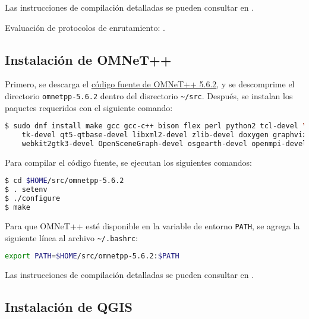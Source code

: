 Las instrucciones de compilación detalladas se pueden consultar en
\cite{CompilacionSUMO}.

Evaluación de protocolos de enrutamiento: \cite{Nishat2011}.

\subsection{Instalación de OMNeT++}

\label{subsec:instalacion_omnet}

Primero, se descarga el \href{https://omnetpp.org/download/}{código fuente de
OMNeT++ 5.6.2}, y se descomprime el directorio
{\lstinline[language=bash]!omnetpp-5.6.2!} dentro del disrectorio
{\lstinline[language=bash]!~/src!}. Después, se instalan los paquetes
requeridos con el siguiente comando:

\begin{lstlisting}[language=bash]
$ sudo dnf install make gcc gcc-c++ bison flex perl python2 tcl-devel \
    tk-devel qt5-qtbase-devel libxml2-devel zlib-devel doxygen graphviz \
    webkit2gtk3-devel OpenSceneGraph-devel osgearth-devel openmpi-devel
\end{lstlisting}

Para compilar el código fuente, se ejecutan los siguientes comandos:

\begin{lstlisting}[language=bash]
$ cd $HOME/src/omnetpp-5.6.2
$ . setenv
$ ./configure
$ make
\end{lstlisting}

Para que OMNeT++ esté disponible en la variable de entorno
{\lstinline[language=bash]!PATH!}, se agrega la siguiente línea al archivo
{\lstinline[language=bash]!~/.bashrc!}:

\begin{lstlisting}[language=bash]
export PATH=$HOME/src/omnetpp-5.6.2:$PATH
\end{lstlisting}

Las instrucciones de compilación detalladas se pueden consultar en
\cite{CompilacionOMNeT}.


\subsection{Instalación de QGIS}


